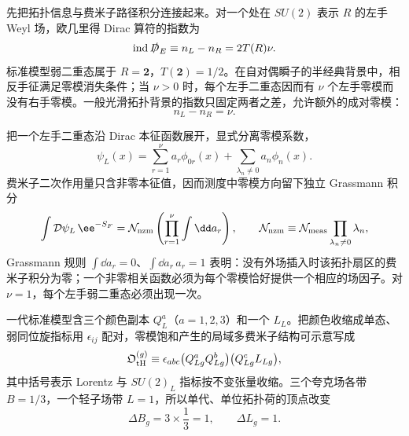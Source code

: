 \begin{derivation}[电弱拓扑跃迁与重子轻子数选择定则]
先把拓扑信息与费米子路径积分连接起来。对一个处在 $SU(2)$ 表示 $R$ 的左手 Weyl 场，欧几里得 Dirac 算符的指数为
\begin{equation*}
 \operatorname{ind}\slashed D_E
 \equiv n_L-n_R=2T(R)\nu.
\end{equation*}
标准模型弱二重态属于 $R=\mathbf2$，$T(\mathbf2)=1/2$。在自对偶瞬子的半经典背景中，相反手征满足零模消失条件；当 $\nu>0$ 时，每个左手二重态因而有 $\nu$ 个左手零模而没有右手零模。一般光滑拓扑背景的指数只固定两者之差，允许额外的成对零模：
\begin{equation*}
 n_L-n_R=\nu.
\end{equation*}

把一个左手二重态沿 Dirac 本征函数展开，显式分离零模系数，
\begin{equation*}
 \psi_L(x)=\sum_{r=1}^{\nu}a_r\phi_{0r}(x)
 +\sum_{\lambda_n\neq0}a_n\phi_n(x).
\end{equation*}
费米子二次作用量只含非零本征值，因而测度中零模方向留下独立 Grassmann 积分
\begin{equation*}
 \int\mathcal D\psi_L\,\ee^{-S_F}
 =\mathcal N_{\rm nzm}
 \left(\prod_{r=1}^{\nu}\int\dd a_r\right),
 \qquad
 \mathcal N_{\rm nzm}\equiv
 \mathcal N_{\rm meas}\prod_{\lambda_n\neq0}\lambda_n,
\end{equation*}
Grassmann 规则 $\int\dd a_r=0$、$\int\dd a_r\,a_r=1$ 表明：没有外场插入时该拓扑扇区的费米子积分为零；一个非零相关函数必须为每个零模恰好提供一个相应的场因子。对 $\nu=1$，每个左手弱二重态必须出现一次。

一代标准模型含三个颜色副本 $Q_L^a$（$a=1,2,3$）和一个 $L_L$。把颜色收缩成单态、弱同位旋指标用 $\epsilon_{ij}$ 配对，零模饱和产生的局域多费米子结构可示意写成
\begin{equation*}
 \mathfrak O_{\rm tH}^{(g)}
 \equiv
 \epsilon_{abc}
 \bigl(Q_{Lg}^{a}Q_{Lg}^{b}\bigr)
 \bigl(Q_{Lg}^{c}L_{Lg}\bigr),
\end{equation*}
其中括号表示 Lorentz 与 $SU(2)_L$ 指标按不变张量收缩。三个夸克场各带 $B=1/3$，一个轻子场带 $L=1$，所以单代、单位拓扑荷的顶点改变
\begin{equation*}
 \Delta B_{g}=3\times\frac13=1,
 \qquad
 \Delta L_{g}=1.
\end{equation*}


\end{derivation}
